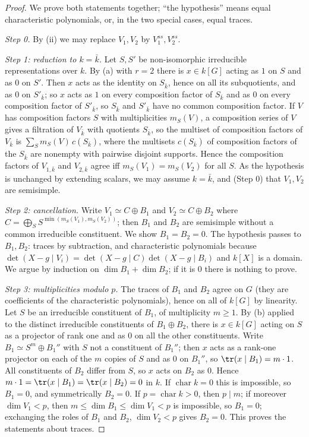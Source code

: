 \begin{proof}
We prove both statements together; ``the hypothesis'' means equal characteristic polynomials, or, in the two special cases, equal
traces.

\emph{Step 0.} By (ii) we may replace $V_1,V_2$ by $V_1^{ss},V_2^{ss}$.

\emph{Step 1: reduction to $k=\bar k$.} Let $S,S'$ be non-isomorphic irreducible representations over $k$. By (a) with
$r=2$ there is $x\in k[G]$ acting as $1$ on $S$ and as $0$ on $S'$. Then $x$ acts as the identity on $S_{\bar k}$, hence on all its subquotients, and as $0$ on $S'_{\bar k}$; so $x$ acts as $1$ on every
composition factor of $S_{\bar k}$ and as $0$
on every composition factor of $S'_{\bar k}$, so $S_{\bar k}$ and $S'_{\bar k}$ have no common composition factor. If $V$ has composition factors $S$ with
multiplicities $m_S(V)$, a composition series of $V$ gives a filtration of $V_{\bar k}$ with quotients $S_{\bar k}$, so the multiset of composition
factors of $V_{\bar k}$ is $\sum_Sm_S(V)\,c(S_{\bar k})$, where the multisets $c(S_{\bar k})$ of composition factors of the $S_{\bar k}$ are nonempty with pairwise
disjoint supports. Hence the composition factors of $V_{1,\bar k}$ and $V_{2,\bar k}$ agree iff $m_S(V_1)=m_S(V_2)$ for all $S$. As the hypothesis is
unchanged by extending scalars, we may assume $k=\bar k$, and (Step 0) that $V_1,V_2$ are semisimple.

\emph{Step 2: cancellation.} Write $V_1\simeq C\oplus B_1$ and $V_2\simeq C\oplus B_2$ where $C=\bigoplus_SS^{\min(m_S(V_1),m_S(V_2))}$; then $B_1$ and $B_2$ are
semisimple without a common irreducible constituent. We show $B_1=B_2=0$. The hypothesis passes to $B_1,B_2$: traces by subtraction,
and characteristic polynomials because $\det(X-g\mid V_i)=\det(X-g\mid C)\det(X-g\mid B_i)$ and $k[X]$ is a domain. We argue by induction on
$\dim B_1+\dim B_2$; if it is $0$ there is nothing to prove.

\emph{Step 3: multiplicities modulo $p$.} The traces of $B_1$ and $B_2$ agree on $G$ (they are coefficients of the characteristic
polynomials), hence on all of $k[G]$ by linearity. Let $S$ be an irreducible constituent of $B_1$, of multiplicity $m\ge1$. By
(b) applied to the distinct irreducible constituents of $B_1\oplus B_2$, there is $x\in k[G]$ acting on $S$ as a projector of
rank one and as $0$ on all the other constituents. Write $B_1\simeq S^m\oplus B_1''$ with $S$ not a constituent of $B_1''$; then $x$ acts as a
rank-one projector on each of the $m$ copies of $S$ and as $0$ on $B_1''$, so $\tr(x\mid B_1)=m\cdot1$. All constituents of $B_2$ differ from $S$, so
$x$ acts on $B_2$ as $0$. Hence $m\cdot1=\tr(x\mid B_1)=\tr(x\mid B_2)=0$ in $k$. If
$\operatorname{char}k=0$ this is impossible, so $B_1=0$, and symmetrically $B_2=0$. If $p=\operatorname{char}k>0$, then $p\mid m$; if moreover
$\dim V_1<p$, then $m\le\dim B_1\le\dim V_1<p$ is impossible, so $B_1=0$; exchanging the roles of $B_1$ and $B_2$, $\dim V_2<p$ gives $B_2=0$. This proves the statements about traces.


\end{proof}
